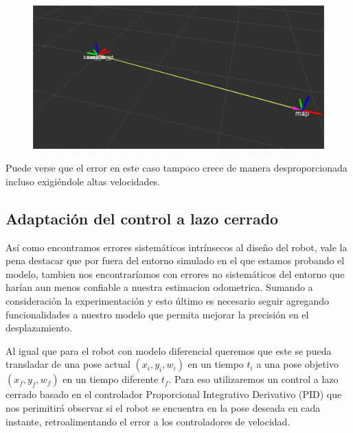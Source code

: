 \begin{figure}[!htb]
\includegraphics[width=\linewidth]{pruebasOdom/3Vueltas2Vel.png}
\end{figure}

Puede verse que el error en este caso tampoco crece de manera desproporcionada incluso exigiéndole altas velocidades.



\subsection{Adaptación del control a lazo cerrado}

Así como encontramos errores sistemáticos intrínsecos al diseño del robot, vale la pena destacar que por fuera del entorno simulado en el que estamos probando el modelo, tambien nos encontraríamos con errores no sistemáticos del entorno que harían aun menos confiable a nuestra estimacion odometrica. Sumando a consideración la experimentación y esto último es necesario seguir agregando funcionalidades a nuestro modelo que permita mejorar la precisión en el desplazamiento. 

Al igual que para el robot con modelo diferencial queremos que este se pueda transladar de una pose actual $(x_i,y_i,w_i)$ en un tiempo $t_i$ a una pose objetivo $(x_f,y_f,w_f)$ en un tiempo diferente $t_f$. Para eso utilizaremos un control a lazo cerrado basado en el controlador Proporcional Integrativo Derivativo (PID) que nos perimitirá observar si el robot se encuentra en la pose deseada en cada instante, retroalimentando el error a los controladores de velocidad.

